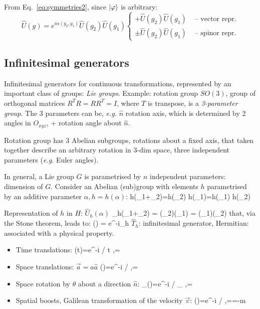 \documentclass[12pt]{article}
\begin{document}
From Eq.~\eqref{eq:symmetries2}, since $\ket{\varphi}$ is arbitrary:
\[
\hat{U}(g)=e^{i \alpha(g_{2}, g_{1})} \hat{U}(g_{2}) \hat{U}(g_{1})
\left\{
\begin{aligned}
+\hat{U}(g_{2}) \hat{U}(g_{1}) 
&\text{ -- vector repr.}\\
\pm\hat{U}(g_{2}) \hat{U}(g_{1}) 
&\text{ -- spinor repr.}
\end{aligned}
\right.
\]

\subsection{Infinitesimal generators}

Infinitesimal generators 
for continuous transformations, represented
by an important class of groups: \emph{Lie groups}.
Example: rotation group \(S O(3)\), group of orthogonal
matrices \(R^{T} R=RR^{T} =I\), where  \(T\) is transpose,
is a \emph{3-parameter group}.
The 3 parameters can be, \textit{e.g.}
\(\hat{n}\) rotation axis,
which is determined by 2 angles in \(O_{xyz}\), + 
rotation angle about \(\hat{n}\).

Rotation group has 3 Abelian subgroups,
rotations about a fixed axis, that taken together
describe an arbitrary rotation in 3-dim space,
three independent parameters (\emph{e.g.} Euler angles).

In general, a Lie group \(G\) is parametrised by
\(n\) independent parameters: dimension of \(G\).
Consider an Abelian (sub)group with elements \(h\)
parametrised by an additive parameter \(\alpha, h=h(\alpha)\):
\be
h\left(\alpha_{1}+\alpha_{2}\right)=h\left(\alpha_{2}\right) h\left(\alpha_{1}\right)=h\left(\alpha_{1}\right) h\left(\alpha_{2}\right)
\ee


Representation of $h$ in $H$: $\hat{U}_h(\alpha)$
\be
{}_h(\alpha_1+\alpha_2) = (\alpha_2)(\alpha_1) = (\alpha_1)(\alpha_2)
\ee
that, via the Stone theorem, leads to:
\be
{}(\alpha) = e^{-i\alpha {}_h}
\ee
$\hat{T}_h$: infinitesimal generator, Hermitian: associated with a physical property.

\begin{itemize}
\item Time translations:
\be
{}(t)=e^{-i / \hbar {} t} \quad,\quad {}=
\ee
%
\item Space translations: $\vec{a}=a \hat{a}$
\be
{}()=e^{-i / \hbar {} \cdot {}} \quad,\quad {}= \rightarrow {}
\ee
%
\item Space rotation by $\theta$ about a direction $\hat{n}$:
\be
{}_{}(\theta)=e^{-i / \hbar \theta {}_{}} \quad,\quad {}= \cdot {} \rightarrow {}
\ee
%
\item Spatial boosts, Galilean transformation of the velocity $\vec{v}$:
\be
{}()=e^{-i / \hbar {} \cdot {}} \quad,\quad {}==-m  \rightarrow {}
\ee
\end{itemize}
\end{document}
